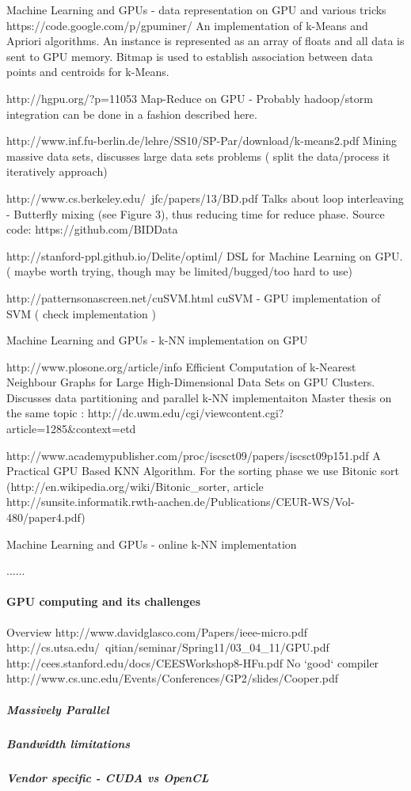 \documentclass[12]{article}
\begin{document}
\begin{list}{*}{}
\item{Machine Learning and GPUs - data representation on GPU and various tricks}
	https://code.google.com/p/gpuminer/
	An implementation of k-Means and Apriori algorithms. An instance is represented as an array of floats and all data is sent to GPU memory. Bitmap is used to establish association between data points and centroids for k-Means.
	
	http://hgpu.org/?p=11053
	Map-Reduce on GPU - Probably hadoop/storm integration can be done in a fashion described here. 
	
	http://www.inf.fu-berlin.de/lehre/SS10/SP-Par/download/k-means2.pdf
	Mining massive data sets, discusses large data sets problems ( split the data/process it iteratively approach)
	
	http://www.cs.berkeley.edu/~jfc/papers/13/BD.pdf
	Talks about loop interleaving - Butterfly mixing (see Figure 3), thus reducing time for reduce phase. Source code:  https://github.com/BIDData
	
	http://stanford-ppl.github.io/Delite/optiml/
	DSL for Machine Learning on GPU. ( maybe worth trying, though may be limited/bugged/too hard to use)
	
	http://patternsonascreen.net/cuSVM.html
	cuSVM - GPU implementation of SVM ( check implementation )

\item{Machine Learning and GPUs - k-NN implementation on GPU}
	
	http://www.plosone.org/article/info%
	Efficient Computation of k-Nearest Neighbour Graphs for Large High-Dimensional Data Sets on GPU Clusters. Discusses data partitioning and parallel k-NN implementaiton
	Master thesis on the same topic : http://dc.uwm.edu/cgi/viewcontent.cgi?article=1285&context=etd
		
	
	http://www.academypublisher.com/proc/iscsct09/papers/iscsct09p151.pdf
	A Practical GPU Based KNN Algorithm. For the sorting phase we use Bitonic sort (http://en.wikipedia.org/wiki/Bitonic_sorter, article http://sunsite.informatik.rwth-aachen.de/Publications/CEUR-WS/Vol-480/paper4.pdf)
	
		

\item{Machine Learning and GPUs - online k-NN implementation }


......

\paragraph{GPU computing and its challenges}
		Overview
		http://www.davidglasco.com/Papers/ieee-micro.pdf
		http://cs.utsa.edu/~qitian/seminar/Spring11/03_04_11/GPU.pdf
		http://cees.stanford.edu/docs/CEESWorkshop8-HFu.pdf
		No `good` compiler
		http://www.cs.unc.edu/Events/Conferences/GP2/slides/Cooper.pdf
	\subparagraph{Massively Parallel}
	\subparagraph{Bandwidth limitations}
	\subparagraph{Vendor specific - CUDA vs OpenCL}	
	

\end{list}
\end{document}

